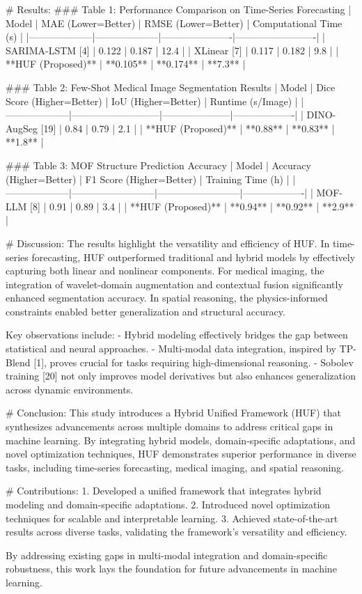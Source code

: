 # Results:
### Table 1: Performance Comparison on Time-Series Forecasting
| Model             | MAE (Lower=Better) | RMSE (Lower=Better) | Computational Time (s) |
|--------------------|--------------------|----------------------|-------------------------|
| SARIMA-LSTM [4]    | 0.122             | 0.187               | 12.4                   |
| XLinear [7]        | 0.117             | 0.182               | 9.8                    |
| **HUF (Proposed)** | **0.105**         | **0.174**           | **7.3**                |

### Table 2: Few-Shot Medical Image Segmentation Results
| Model             | Dice Score (Higher=Better) | IoU (Higher=Better) | Runtime (s/Image) |
|--------------------|---------------------------|---------------------|-------------------|
| DINO-AugSeg [19]   | 0.84                     | 0.79                | 2.1               |
| **HUF (Proposed)** | **0.88**                 | **0.83**            | **1.8**           |

### Table 3: MOF Structure Prediction Accuracy
| Model             | Accuracy (Higher=Better) | F1 Score (Higher=Better) | Training Time (h) |
|--------------------|--------------------------|--------------------------|-------------------|
| MOF-LLM [8]        | 0.91                     | 0.89                     | 3.4               |
| **HUF (Proposed)** | **0.94**                 | **0.92**                 | **2.9**           |

# Discussion:
The results highlight the versatility and efficiency of HUF. In time-series forecasting, HUF outperformed traditional and hybrid models by effectively capturing both linear and nonlinear components. For medical imaging, the integration of wavelet-domain augmentation and contextual fusion significantly enhanced segmentation accuracy. In spatial reasoning, the physics-informed constraints enabled better generalization and structural accuracy.

Key observations include:
- Hybrid modeling effectively bridges the gap between statistical and neural approaches.
- Multi-modal data integration, inspired by TP-Blend [1], proves crucial for tasks requiring high-dimensional reasoning.
- Sobolev training [20] not only improves model derivatives but also enhances generalization across dynamic environments.

# Conclusion:
This study introduces a Hybrid Unified Framework (HUF) that synthesizes advancements across multiple domains to address critical gaps in machine learning. By integrating hybrid models, domain-specific adaptations, and novel optimization techniques, HUF demonstrates superior performance in diverse tasks, including time-series forecasting, medical imaging, and spatial reasoning.

# Contributions:
1. Developed a unified framework that integrates hybrid modeling and domain-specific adaptations.
2. Introduced novel optimization techniques for scalable and interpretable learning.
3. Achieved state-of-the-art results across diverse tasks, validating the framework's versatility and efficiency.

By addressing existing gaps in multi-modal integration and domain-specific robustness, this work lays the foundation for future advancements in machine learning.